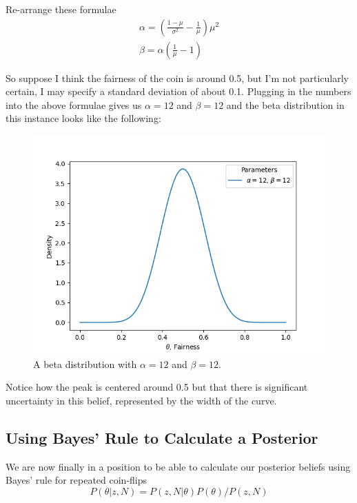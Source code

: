 Re-arrange these formulae 
\begin{equation}
  \begin{gathered}
    \alpha = \left(\frac{1-\mu}{\sigma^2} - \frac{1}{\mu} \right) \mu^2\\
    \beta = \alpha\left(\frac{1}{\mu}-1 \right)
  \end{gathered}
\end{equation}


So suppose I think the fairness of the coin is around 0.5, but I'm not particularly certain, I may specify a standard deviation of about 0.1. Plugging in the numbers into the above formulae gives us $\alpha = 12$ and $\beta = 12$ and the beta distribution in this instance looks like the following:
\begin{figure}[htb]
  \centering
  \includegraphics[width=.7\textwidth]{figures/beta_12_12}
  \caption{A beta distribution with $\alpha=12$ and $\beta=12$.}
  \label{fig:beta_12_12}
\end{figure}

Notice how the peak is centered around 0.5 but that there is significant uncertainty in this belief, represented by the width of the curve.

\subsection{Using Bayes' Rule to Calculate a Posterior}

We are now finally in a position to be able to calculate our posterior beliefs using Bayes' rule for repeated coin-flips
\begin{equation}
  P(\theta|z,N)=P(z,N|\theta)P(\theta)/P(z,N)
\end{equation}

